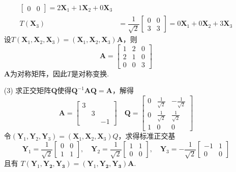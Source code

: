 \documentclass[12pt, a4paper, oneside, fontset=none]{ctexart}
\begin{document}
\begin{enumerate}
\begin{align*}
\begin{bmatrix}
                0 & 0
            \end{bmatrix} = 2\bm{X}_1 + 1\bm{X}_2 + 0\bm{X}_3 \\
            T(\bm{X}_3) & = \dfrac{1}{\sqrt{2}}
            \begin{bmatrix}
                0 & 0 \\
                3 & 3
            \end{bmatrix} = 0\bm{X}_1 + 0\bm{X}_2 + 3\bm{X}_3
        \end{align*}
        设$T(\bm{X}_1,\bm{X}_2,\bm{X}_3) = (\bm{X}_1,\bm{X}_2,\bm{X}_3)\bm{A}$，则
        \[
            \bm{A} = \begin{bmatrix}
                1 & 2 & 0 \\
                2 & 1 & 0 \\
                0 & 0 & 3
            \end{bmatrix}
        \]
        $\bm{A}$为对称矩阵，因此$T$是对称变换.
    \item[(3)]
        求正交矩阵$\bm{Q}$使得$\bm{Q}^{-1}\bm{AQ} = \bm{A}$，解得
        \[
            \bm{A} = \begin{bmatrix}
                3 &   &    \\
                  & 3 &    \\
                  &   & -1
            \end{bmatrix} \quad \bm{Q} = \begin{bmatrix}
                0 & \frac{1}{\sqrt{2}} & -\frac{1}{\sqrt{2}} \\
                0 & \frac{1}{\sqrt{2}} & \frac{1}{\sqrt{2}}  \\
                1 & 0                  & 0
            \end{bmatrix}
        \]
        令$(\bm{Y}_1,\bm{Y}_2,\bm{Y}_3) = (\bm{X}_1,\bm{X}_2,\bm{X}_3)Q$，求得标准正交基
        \[
            \bm{Y}_1 = \dfrac{1}{\sqrt{2}}\begin{bmatrix}
                0 & 0 \\
                1 & 1
            \end{bmatrix},\quad \bm{Y}_2 = \dfrac{1}{\sqrt{2}}\begin{bmatrix}
                1 & 1 \\
                0 & 0
            \end{bmatrix},\quad \bm{Y}_3 = -\dfrac{1}{\sqrt{2}}\begin{bmatrix}
                -1 & 1 \\
                0  & 0
            \end{bmatrix}
        \]
        且有 $T(\bm{Y}_1,\bm{Y_2},\bm{Y_3}) = (\bm{Y}_1,\bm{Y_2},\bm{Y_3})\bm{A}$.
\end{enumerate}
\par \ \par
\end{document}
